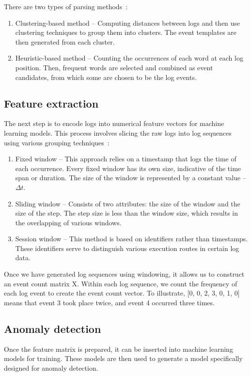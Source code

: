 There are two types of parsing methods~\cite{he2016expreport}:
\begin{enumerate}
    \item Clustering-based method \--- Computing distances between logs and then use clustering techniques to group them into clusters. The event templates are then generated from each cluster.
    \item Heuristic-based method \--- Counting the occurrences of each word at each log position. Then, frequent words are selected and combined as event candidates, from which some are chosen to be the log events.
\end{enumerate}

\subsection{Feature extraction}
The next step is to encode logs into numerical feature vectors for machine learning models. This process involves slicing the raw logs into log sequences using various grouping techniques~\cite{he2016expreport}:

\begin{enumerate}
    \item Fixed window \--- This approach relies on a timestamp that logs the time of each occurrence. Every fixed window has its own size, indicative of the time span or duration. The size of the window is represented by a constant value \--- $\Delta t$.
    \item Sliding window \--- Consists of two attributes: the size of the window and the size of the step. The step size is less than the window size, which results in the overlapping of various windows.
    \item Session window \--- This method is based on identifiers rather than timestamps. These identifiers serve to distinguish various execution routes in certain log data.
\end{enumerate}

Once we have generated log sequences using windowing, it allows us to construct an event count matrix X. Within each log sequence, we count the frequency of each log event to create the event count vector. To illustrate, [0, 0, 2, 3, 0, 1, 0] means that event 3 took place twice, and event 4 occurred three times.~\cite{he2016expreport}

\subsection{Anomaly detection}
Once the feature matrix is prepared, it can be inserted into machine learning models for training. These models are then used to generate a model specifically designed for anomaly detection.~\cite{he2016expreport}

